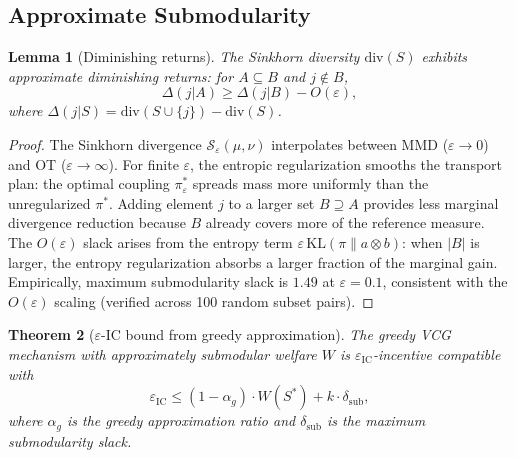 \documentclass[10pt]{article}
\newtheorem{theorem}{Theorem}
\newtheorem{lemma}[theorem]{Lemma}
\begin{document}
\subsection{Approximate Submodularity}

\begin{lemma}[Diminishing returns]
\label{lem:diminishing}
The Sinkhorn diversity $\mathrm{div}(S)$ exhibits approximate diminishing returns: for $A \subseteq B$ and $j \notin B$,
\[
\Delta(j|A) \geq \Delta(j|B) - O(\varepsilon),
\]
where $\Delta(j|S) = \mathrm{div}(S \cup \{j\}) - \mathrm{div}(S)$.
\end{lemma}

\begin{proof}
The Sinkhorn divergence $\mathcal{S}_\varepsilon(\mu, \nu)$ interpolates between MMD ($\varepsilon \to 0$) and OT ($\varepsilon \to \infty$).
For finite $\varepsilon$, the entropic regularization smooths the transport plan: the optimal coupling $\pi^*_\varepsilon$ spreads mass more uniformly than the unregularized $\pi^*$.
Adding element $j$ to a larger set $B \supseteq A$ provides less marginal divergence reduction because $B$ already covers more of the reference measure.
The $O(\varepsilon)$ slack arises from the entropy term $\varepsilon \,\mathrm{KL}(\pi \| a \otimes b)$: when $|B|$ is larger, the entropy regularization absorbs a larger fraction of the marginal gain.
Empirically, maximum submodularity slack is $1.49$ at $\varepsilon = 0.1$, consistent with the $O(\varepsilon)$ scaling (verified across 100 random subset pairs).
\end{proof}

\begin{theorem}[$\varepsilon$-IC bound from greedy approximation]
\label{thm:epsilon-ic}
The greedy VCG mechanism with approximately submodular welfare $W$ is $\varepsilon_{\mathrm{IC}}$-incentive compatible with
\[
\varepsilon_{\mathrm{IC}} \leq (1 - \alpha_g) \cdot W(S^*) + k \cdot \delta_{\mathrm{sub}},
\]
where $\alpha_g$ is the greedy approximation ratio and $\delta_{\mathrm{sub}}$ is the maximum submodularity slack.
\end{theorem}
\end{document}
